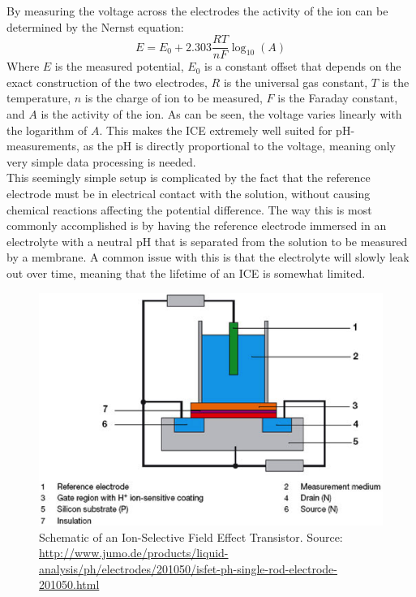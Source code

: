 \noindent
By measuring the voltage across the electrodes the activity of the ion can be determined by the Nernst equation\cite{website:ph1}:
\begin{equation}\label{key}
E = E_0 + 2.303 \frac{R T}{n F} \log_{10}{(A)}
\end{equation}
Where $E$ is the measured potential, $E_0$ is a constant offset that depends on the exact construction of the two electrodes, $R$ is the universal gas constant, $T$ is the temperature, $n$ is the charge of ion to be measured, $F$ is the Faraday constant, and $A$ is the activity of the ion\cite{website:ph1}. As can be seen, the voltage varies linearly with the logarithm of $A$. This makes the ICE extremely well suited for pH-measurements, as the pH is directly proportional to the voltage, meaning only very simple data processing is needed.\\


\noindent
This seemingly simple setup is complicated by the fact that the reference electrode must be in electrical contact with the solution, without causing chemical reactions affecting the potential difference. The way this is most commonly accomplished is by having the reference electrode immersed in an electrolyte with a neutral pH that is separated from the solution to be measured by a membrane\cite{website:ph2}. A common issue with this is that the electrolyte will slowly leak out over time, meaning that the lifetime of an ICE is somewhat limited. \\

\begin{figure}[htb]
	\centering
	\includegraphics[width=.7\textwidth]{figures/ISFET.png}
	\caption{Schematic of an Ion-Selective Field Effect Transistor. Source: \url{http://www.jumo.de/products/liquid-analysis/ph/electrodes/201050/isfet-ph-single-rod-electrode-201050.html}}
	\label{fig:ISFET}
\end{figure}

